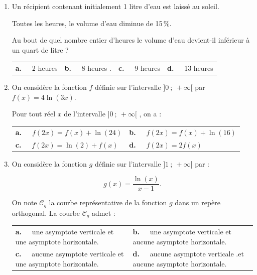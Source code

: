 \bigskip
\begin{enumerate}
\item Un récipient contenant initialement 1 litre d'eau est laissé au soleil.

Toutes les heures, le volume d'eau diminue de 15\,\%.

Au bout de quel nombre entier d'heures le volume d'eau devient-il inférieur à un quart de litre ?

\begin{center}
\begin{tabularx}{\linewidth}{*{4}{X}}
\textbf{a.~~} 2 heures &\textbf{b.~~}  8 heures .&
\textbf{c.~~} 9 heures&\textbf{d.~~} 13 heures 
\end{tabularx}
\end{center}

\item On considère la fonction $f$ définie sur l'intervalle $]0~;~+\infty[$ par $f(x) = 4\ln (3x)$.

Pour tout réel $x$ de l'intervalle $]0~;~+\infty[$ , on a :

\begin{center}
\begin{tabularx}{\linewidth}{*{2}{X}}
\textbf{a.~~} $f(2x) = f(x) + \ln (24)$&\textbf{b.~~} $f(2x) = f(x) + \ln (16)$\\
\textbf{c.~~} $f(2x) = \ln (2) + f(x)$& \textbf{d.~~} $f(2x) = 2f(x)$
\end{tabularx}
\end{center}
\item On considère la fonction $g$ définie sur l'intervalle $]1~;~+\infty[$ par : 

\[g(x) = \dfrac{\ln (x)}{x - 1}.\]


On note $\mathcal{C}_g$ la courbe représentative de la fonction $g$ dans un repère orthogonal. La courbe $\mathcal{C}_g$ admet :

\begin{center}
\begin{tabularx}{\linewidth}{*{2}{X}}
\textbf{a.~~} une asymptote verticale
et une asymptote horizontale.&\textbf{b.~~} une asymptote verticale
et aucune asymptote horizontale.\\
\textbf{c.~~} aucune asymptote verticale et une asymptote horizontale.&\textbf{d.~~} 
aucune asymptote verticale .et aucune asymptote horizontale.
\end{tabularx}
\end{center}
\end{enumerate}

